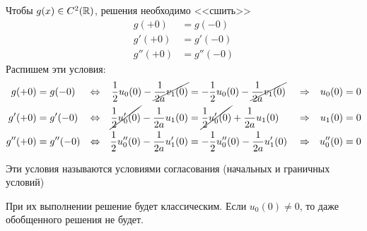 \documentclass[../main.tex]{subfiles}
\begin{document}
Чтобы $g(x) \in C^2(\mathbb{R})$, решения необходимо <<сшить>>
\begin{align*}
    g(+0) &= g(-0) \\
    g'(+0) &= g'(-0) \\
    g''(+0) &= g''(-0)
\end{align*}
Распишем эти условия:
\begin{align*}
     g(+0) &= g(-0) &\Leftrightarrow&& 
    \frac{1}{2}u_0(0) - \cancel{\frac{1}{2a}v_1(0)} &= -\frac{1}{2}u_0(0) - \cancel{\frac{1}{2a}v_1(0)} &&\Rightarrow& u_0(0) &= 0 \\
     g'(+0) &= g'(-0) &\Leftrightarrow&& \cancel{\frac{1}{2}u'_0(0)} - \frac{1}{2a}u_1(0) &=
    \cancel{\frac{1}{2}u'_0(0)} + \frac{1}{2a}u_1(0) &&\Rightarrow& u_1(0) &= 0 \\
     g''(+0) &= g''(-0) &\Leftrightarrow&& \frac{1}{2} u''_0(0) - \frac{1}{2a} u_1'(0) &= -\frac{1}{2}u_0''(0) - \frac{1}{2a} u_1'(0) &&\Rightarrow& u_0''(0) &= 0
\end{align*}

\begin{definition}
    Эти условия называются условиями согласования (начальных и граничных условий)
\end{definition}

При их выполнении решение будет классическим. Если $u_0(0) \ne 0$, то даже обобщенного решения не будет.

\end{document}
